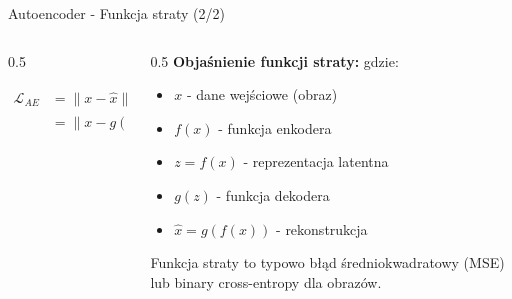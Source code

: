 \documentclass{beamer}
\begin{document}
\begin{frame}{Autoencoder - Funkcja straty (2/2)}
    \begin{columns}
        \begin{column}{0.5\textwidth}
            \begin{tcolorbox}[colback=yellow!10!white, colframe=black!60, boxrule=0.5pt, arc=3mm]
                \begin{align*}
                    \mathcal{L}_{AE} & = \|x - \hat{x}\|^2 \\
                                     & = \|x - g(f(x))\|^2
                \end{align*}
            \end{tcolorbox}
        \end{column}
        \begin{column}{0.5\textwidth}
            \textbf{Objaśnienie funkcji straty:}
            \medskip
            gdzie:
            \begin{itemize}
                \item $x$ - dane wejściowe (obraz)
                \item $f(x)$ - funkcja enkodera
                \item $z = f(x)$ - reprezentacja latentna
                \item $g(z)$ - funkcja dekodera
                \item $\hat{x} = g(f(x))$ - rekonstrukcja
            \end{itemize}

            Funkcja straty to typowo błąd średniokwadratowy (MSE) lub binary cross-entropy dla obrazów.
        \end{column}
    \end{columns}
\end{frame}
\end{document}
